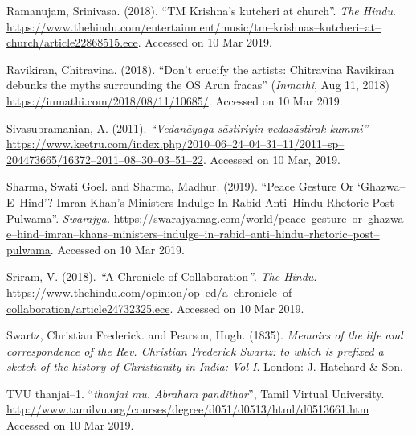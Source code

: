 \begin{thebibliography}{99}
  Ramanujam, Srinivasa. (2018). “TM Krishna’s kutcheri at church”. \textit{The Hindu}. \url{https://www.thehindu.com/entertainment/music/tm–krishnas–kutcheri–at–church/article22868515.ece}. Accessed on 10 Mar 2019.

  Ravikiran, Chitravina. (2018). “Don’t crucify the artists: Chitravina Ravikiran debunks the myths surrounding the OS Arun fracas” (\textit{Inmathi}, Aug 11, 2018) \url{https://inmathi.com/2018/08/11/10685/}. Accessed on 10 Mar 2019.

  Sivasubramanian, A. (2011). \textit{“Vedanāyaga sāstiriyin vedasāstirak kummi”} \url{https://www.keetru.com/index.php/2010–06–24–04–31–11/2011–sp–204473665/16372–2011–08–30–03–51–22}. Accessed on 10 Mar, 2019.

  Sharma, Swati Goel. and Sharma, Madhur. (2019). “Peace Gesture Or ‘Ghazwa–E–Hind’? Imran Khan’s Ministers Indulge In Rabid Anti–Hindu Rhetoric Post Pulwama”. \textit{Swarajya.} \url{https://swarajyamag.com/world/peace–gesture–or–ghazwa–e–hind–imran–khans–ministers–indulge–in–rabid–anti–hindu–rhetoric–post–pulwama}. Accessed on 10 Mar 2019.

  Sriram, V. (2018). \textit{“}A Chronicle of Collaboration\textit{”}. \textit{The Hindu}. \url{https://www.thehindu.com/opinion/op–ed/a–chronicle–of–collaboration/article24732325.ece}. Accessed on 10 Mar 2019.

  Swartz, Christian Frederick. and Pearson, Hugh. (1835). \textit{Memoirs of the life and correspondence of the Rev. Christian Frederick Swartz: to which is prefixed a sketch of the history of Christianity in India: Vol I}. London: J. Hatchard \& Son.

  TVU thanjai–1. “\textit{thanjai mu. Abraham pandithar}”, Tamil Virtual University. \url{http://www.tamilvu.org/courses/degree/d051/d0513/html/d0513661.htm} Accessed on 10 Mar 2019.

 \end{thebibliography}

